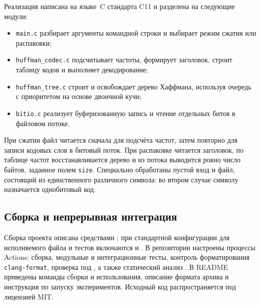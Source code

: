 Реализация написана на языке~C стандарта C11 и разделена на следующие модули:
\begin{itemize}
    \item \texttt{main.c} разбирает аргументы командной строки и выбирает режим
          сжатия или распаковки;
    \item \texttt{huffman\_codec.c} подсчитывает частоты, формирует заголовок,
          строит таблицу кодов и выполняет декодирование;
    \item \texttt{huffman\_tree.c} строит и освобождает дерево Хаффмана,
          используя очередь с приоритетом на основе двоичной кучи;
    \item \texttt{bitio.c} реализует буферизованную запись и чтение отдельных
          битов в файловом потоке.
\end{itemize}

При сжатии файл читается сначала для подсчёта частот, затем повторно для записи
кодовых слов в битовый поток. При распаковке читается заголовок, по таблице
частот восстанавливается дерево и из потока выводится ровно число байтов,
заданное полем \texttt{size}. Специально обработаны пустой вход и файл,
состоящий из единственного различного символа: во втором случае символу
назначается однобитовый код.

\subsection{Сборка и непрерывная интеграция}

Сборка проекта описана средствами \CMake{}; при стандартной конфигурации для
исполняемого файла и тестов включаются \AddressSanitizer{} и
\UndefinedBehaviorSanitizer{}. В репозитории настроены процессы \GitHub{}
Actions: сборка, модульные и интеграционные тесты, контроль форматирования
\texttt{clang-format}, проверка под \Valgrind{}, а также статический анализ
\CodeQL{}. В README приведены команды сборки и использования, описание формата
архива и инструкция по запуску экспериментов. Исходный код распространяется под
лицензией MIT.
